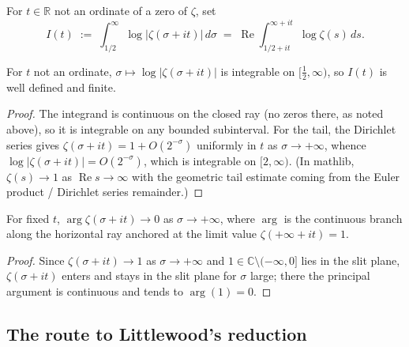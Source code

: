 \begin{definition}
\label{def:lb_I}
\leanok
{}
For $t\in\mathbb{R}$ not an ordinate of a zero of $\zeta$, set
\[
  I(t) \;:=\; \int_{1/2}^{\infty}\log\bigl|\zeta(\sigma+it)\bigr|\,d\sigma
  \;=\; \operatorname{Re}\int_{1/2+it}^{\infty+it}\log\zeta(s)\,ds .
\]
\end{definition}

\begin{lemma}[Convergence of $I$]
\label{lem:lb_I_integrable}
\leanok
{}
For $t$ not an ordinate, $\sigma\mapsto\log|\zeta(\sigma+it)|$ is integrable on
$[\tfrac12,\infty)$, so $I(t)$ is well defined and finite.
\end{lemma}

\begin{proof}
\leanok
The integrand is continuous on the closed ray (no zeros there, as noted above),
so it is integrable on any bounded subinterval. For the tail, the Dirichlet
series gives $\zeta(\sigma+it) = 1 + O(2^{-\sigma})$ uniformly in $t$ as
$\sigma\to+\infty$, whence $\log|\zeta(\sigma+it)| = O(2^{-\sigma})$, which is
integrable on $[2,\infty)$. (In mathlib, $\zeta(s)\to1$ as $\operatorname{Re}s\to\infty$
with the geometric tail estimate coming from the Euler product / Dirichlet
series remainder.)
\end{proof}

\begin{lemma}
\label{lem:lb_arg_tendsto}
\leanok
{}
For fixed $t$, $\arg\zeta(\sigma+it)\to 0$ as $\sigma\to+\infty$, where $\arg$ is
the continuous branch along the horizontal ray anchored at the limit value
$\zeta(+\infty+it)=1$.
\end{lemma}

\begin{proof}
\leanok
Since $\zeta(\sigma+it)\to1$ as $\sigma\to+\infty$ and $1\in\mathbb{C}\setminus(-\infty,0]$
lies in the slit plane, $\zeta(\sigma+it)$ enters and stays in the slit plane for
$\sigma$ large; there the principal argument is continuous and tends to
$\arg(1)=0$.
\end{proof}

\subsection*{The route to Littlewood's reduction}
\label{ssec:lb_littlewood_design}

